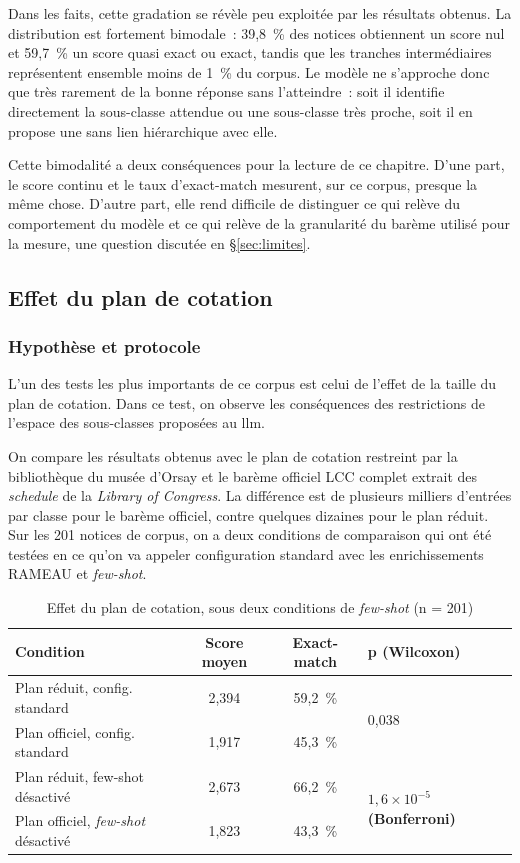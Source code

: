 Dans les faits, cette gradation se révèle peu exploitée par les résultats obtenus. La distribution est fortement bimodale~: 39,8~\% des notices obtiennent un score nul et 59,7~\% un score quasi exact ou exact, tandis que les tranches intermédiaires représentent ensemble moins de 1~\% du corpus. Le modèle ne s'approche donc que très rarement de la bonne réponse sans l'atteindre~: soit il identifie directement la sous-classe attendue ou une sous-classe très proche, soit il en propose une sans lien hiérarchique avec elle.

Cette bimodalité a deux conséquences pour la lecture de ce chapitre. D'une part, le score continu et le taux d'exact-match mesurent, sur ce corpus, presque la même chose. D'autre part, elle rend difficile de distinguer ce qui relève du comportement du modèle et ce qui relève de la granularité du barème utilisé pour la mesure, une question discutée en \S\ref{sec:limites}.




\subsection{Effet du plan de cotation}
\label{sec:effet-plan-reduit}

\subsubsection*{Hypothèse et protocole}

L'un des tests les plus importants de ce corpus est celui de l'effet de la taille du plan de cotation. Dans ce test, on observe les conséquences des restrictions de l'espace des sous-classes proposées au \gls{llm}.

On compare les résultats obtenus avec le plan de cotation restreint par la bibliothèque du musée d'Orsay et le barème officiel LCC complet extrait des \textit{schedule} de la \textit{Library of Congress}. La différence est de plusieurs milliers d'entrées par classe pour le barème officiel, contre quelques dizaines pour le plan réduit.
Sur les 201 notices de corpus, on a deux conditions de comparaison qui ont été testées en ce qu'on va appeler configuration standard avec les enrichissements RAMEAU et \textit{few-shot}. 


\begin{table}[h]
\centering
\begin{tabular}{lccl}
\toprule
\textbf{Condition} & \textbf{Score moyen} & \textbf{Exact-match} & \textbf{p (Wilcoxon)} \\
\midrule
Plan réduit, config. standard & 2,394 & 59,2~\% & \multirow{2}{*}{0,038} \\
Plan officiel, config. standard & 1,917 & 45,3~\% & \\
\midrule
Plan réduit, few-shot désactivé & 2,673 & 66,2~\% & \multirow{2}{*}{$1,6\times10^{-5}$ \textbf{(Bonferroni)}} \\
Plan officiel, \textit{few-shot} désactivé & 1,823 & 43,3~\% & \\
\bottomrule
\end{tabular}
\caption{Effet du plan de cotation, sous deux conditions de \textit{few-shot} (n = 201)}
\label{tab:plan-reduit-officiel}
\end{table}

